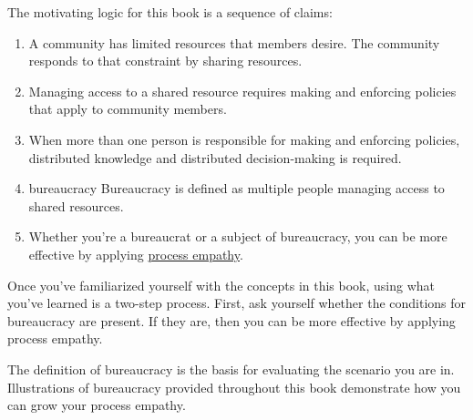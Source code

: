 The motivating logic for this book is a sequence of claims:
\begin{enumerate}
    \item A community has limited resources that members desire. The community responds to that constraint by sharing resources.
    \item Managing access to a \gls{shared resource} 
    \marginpar{[Glossary]}
    requires making and enforcing policies that apply to community members. 
    \item When more than one person is responsible for making and enforcing policies, distributed knowledge and distributed decision-making is required. 
    \item 
\ifglossarysubstitutionworks
\Gls{bureaucracy} 
\else
Bureaucracy
\fi
    \marginpar{[Glossary]}
    is defined as multiple people managing access to \glspl{shared resource}. 
    \item Whether you're a \gls{bureaucrat} 
    \marginpar{[Glossary]}
    or a subject of bureaucracy, you can be more effective by applying \hyperref[sec:process-empathy]{process empathy}.
\end{enumerate}

Once you've familiarized yourself with the concepts in this book, using what you've learned is a two-step process. First, ask yourself whether the conditions for bureaucracy are present. If they are, then you can be more effective by applying process empathy.

The definition of bureaucracy is the basis for evaluating the scenario you are in. Illustrations of bureaucracy provided throughout this book demonstrate how you can grow your process empathy. 